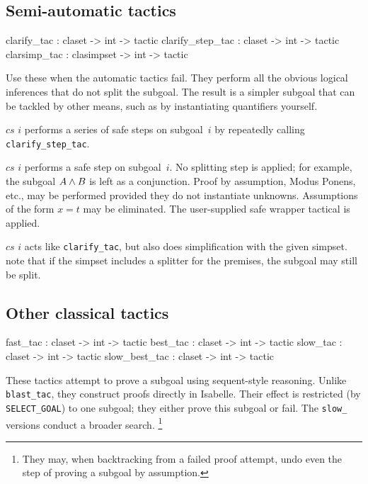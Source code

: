 \subsection{Semi-automatic tactics}
\begin{ttbox} 
clarify_tac      : claset -> int -> tactic
clarify_step_tac : claset -> int -> tactic
clarsimp_tac     : clasimpset -> int -> tactic
\end{ttbox}
Use these when the automatic tactics fail.  They perform all the obvious
logical inferences that do not split the subgoal.  The result is a
simpler subgoal that can be tackled by other means, such as by
instantiating quantifiers yourself.
\begin{ttdescription}
\item[\ttindexbold{clarify_tac} $cs$ $i$] performs a series of safe steps on
subgoal~$i$ by repeatedly calling \texttt{clarify_step_tac}.
\item[\ttindexbold{clarify_step_tac} $cs$ $i$] performs a safe step on
  subgoal~$i$.  No splitting step is applied; for example, the subgoal $A\wedge
  B$ is left as a conjunction.  Proof by assumption, Modus Ponens, etc., may be
  performed provided they do not instantiate unknowns.  Assumptions of the
  form $x=t$ may be eliminated.  The user-supplied safe wrapper tactical is
  applied.
\item[\ttindexbold{clarsimp_tac} $cs$ $i$] acts like \texttt{clarify_tac}, but
also does simplification with the given simpset. note that if the simpset 
includes a splitter for the premises, the subgoal may still be split.
\end{ttdescription}


\subsection{Other classical tactics}
\begin{ttbox} 
fast_tac      : claset -> int -> tactic
best_tac      : claset -> int -> tactic
slow_tac      : claset -> int -> tactic
slow_best_tac : claset -> int -> tactic
\end{ttbox}
These tactics attempt to prove a subgoal using sequent-style reasoning.
Unlike \texttt{blast_tac}, they construct proofs directly in Isabelle.  Their
effect is restricted (by \texttt{SELECT_GOAL}) to one subgoal; they either prove
this subgoal or fail.  The \texttt{slow_} versions conduct a broader
search.%
\footnote{They may, when backtracking from a failed proof attempt, undo even
  the step of proving a subgoal by assumption.}

